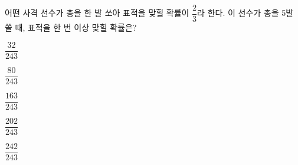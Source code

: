 어떤 사격 선수가 총을 한 발 쏘아 표적을 맞힐 확률이 $\dfrac{2}{3}$라 한다. 이 선수가 총을 5발 쏠 때, 표적을 한 번 이상 맞힐 확률은?
\begin{choices32}{\rule[-3ex]{0pt}{8ex}$\dfrac{32}{243}$}{\rule[-3ex]{0pt}{8ex}$\dfrac{80}{243}$}{\rule[-3ex]{0pt}{8ex}$\dfrac{163}{243}$}{\rule[-3ex]{0pt}{8ex}$\dfrac{202}{243}$}{\rule[-3ex]{0pt}{8ex}$\dfrac{242}{243}$}\end{choices32}
